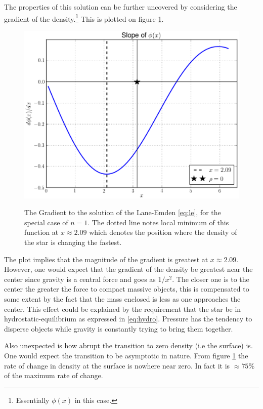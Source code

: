 \documentclass[12pt, manuscript]{article}
\begin{document}
\noindent The properties of this solution can be further uncovered by considering the gradient of the density.\footnote{Essentially $\phi(x)$ in this case.} This is plotted on figure \ref{f:grad}.

\begin{figure}[h]
  \begin{center}
      \includegraphics[scale=0.7]{images/SlopePhi.eps}\label{f:grad}
  \caption{The Gradient to the solution of the Lane-Emden \eqref{eq:le}, for the special case of $n=1$. The dotted line notes local minimum of this function at $x\approx2.09$ which denotes the position where the density of the star is changing the fastest.}
  \end{center}
  \end{figure}
\noindent The plot implies that the magnitude of the  gradient is greatest at $x\approx 2.09$. However, one would expect that the gradient of the density be greatest near the center since gravity is a central force and goes as $1/x^{2}$. The closer one is to the center the greater the force to compact massive objects, this is compensated to some extent by the fact that the mass enclosed is less as one approaches the center. This effect could be explained by the requirement that the star be in hydrostatic-equilibrium as expressed in \eqref{eq:hydro}. Pressure has the tendency to disperse objects while gravity is constantly trying to bring them together. \par

\noindent Also unexpected is how abrupt the transition to zero density (i.e the surface) is. One would expect the transition to be asymptotic in nature. From figure \ref{f:grad} the rate of change in density at the surface is nowhere near zero. In fact it is $\approx75$\% of the maximum rate of change.\par
\end{document}

